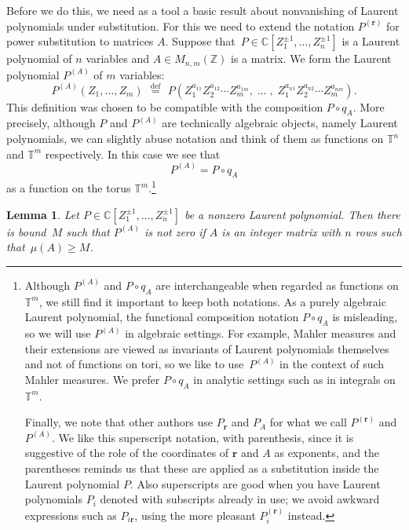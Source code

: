 \documentclass[12pt]{amsart}
\theoremstyle{plain}
\newtheorem{lemma}[theorem]{Lemma}
\theoremstyle{definition}
\theoremstyle{remark}
\numberwithin{theorem}{section}
\numberwithin{equation}{section} %
\newcommand{\defeq}{\stackrel{\mathrm{def}}{\, = \,}}
\newcommand{\bZ}{{\mathbb{Z}}}
\newcommand{\bC}{{\mathbb{C}}}
\newcommand{\mb}{\mathbf}
\newcommand{\torus}{{\mathbb{T}}}
\begin{document}
Before we do this, we need as a tool a basic result about nonvanishing of Laurent polynomials under substitution. For this we need to extend the notation $P^{(\mb r)}$ for power
substitution to matrices $A$.
Suppose that~$P \in \bC\left[Z^{\pm 1}_1, \ldots, Z^{\pm 1}_n\right]$ is a Laurent polynomial of $n$ variables and $A\in M_{n,m}(\bZ)$ is a matrix.
We form the Laurent polynomial $P^{(A)}$ of $m$ variables:
$$
P^{(A)}(Z_1, \ldots, Z_m) \; \defeq \; 
P\left( Z_1^{a_{11}}  Z_2^{a_{12}} \cdots  Z_m^{a_{1m}},  \;  \ldots \; , \; Z_1^{a_{n1}}  Z_2^{a_{n2}} \cdots  Z_m^{a_{nm}} 
\right).
$$
This definition was chosen to be compatible with the composition $P \circ q_A$.
More precisely, although $P$ and $P^{(A)}$ are technically algebraic objects, namely Laurent polynomials, we can slightly abuse notation and think of them as functions on $\torus^n$ and $\torus^m$ respectively. In this case we see that
$$
P^{(A)} = P \circ q_A
$$
as a function on  the torus $\torus^m$.\footnote{Although $P^{(A)}$ and $P \circ q_A$ are interchangeable when regarded as functions on $\torus^m$,  we still find it important to keep both notations.
As a purely algebraic Laurent polynomial, the functional composition notation $P \circ q_A$ is misleading, so we will use $P^{(A)}$ in algebraic settings. For example, Mahler measures and their extensions are
viewed as invariants of Laurent polynomials themselves and not of functions on tori, so we like to use~$P^{(A)}$ in the context of such Mahler measures. We prefer $P \circ q_A$ in analytic settings such as in integrals on~$\torus^m$.

Finally, we note that other authors use $P_{\mb r}$ and $P_A$ for what we call  $P^{(\mb r)}$ and $P^{(A)}$. We like this superscript notation, with parenthesis, since it is suggestive of the role of the coordinates
of $\mb r$ and $A$ as exponents, and the parentheses reminds us that these are applied as a substitution inside the Laurent polynomial $P$. Also superscripts are good when you have Laurent polynomials $P_i$ denoted with subscripts already in use; we avoid awkward expressions such as $P_{i \mb r}$, using the more pleasant  $P^{(\mb r)}_i$ instead.}



\begin{lemma} \label{Pqr_nonvanishing}
Let $P \in \bC\left[Z^{\pm 1}_1, \ldots, Z^{\pm 1}_n\right]$ be a nonzero Laurent polynomial. Then
there is bound~$M$ such that $P^{(A)}$ is not zero if $A$ is an integer matrix with $n$ rows such that~$\mu(A) \ge M$. 
\end{lemma}
\end{document}
